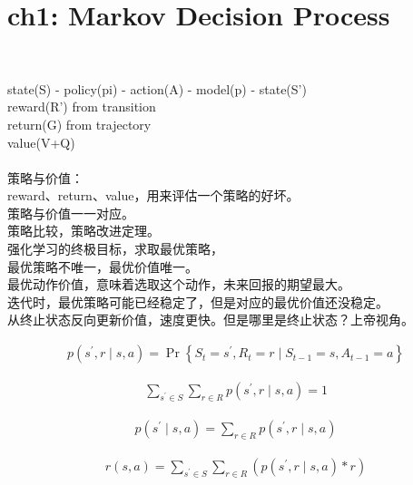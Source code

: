 \documentclass{article}
\begin{document}
\section*{ch1: Markov Decision Process}


~ \\[3pt]  %
\begin{CJK}{UTF8}{gbsn}
    state(S) - policy(pi) - action(A) - model(p) - state(S') \\[3pt]
    reward(R') from transition \\[3pt]
    return(G) from trajectory \\[3pt]
    value(V+Q) \\[3pt]

    ~ \\[3pt]
    策略与价值：\\[3pt]
    reward、return、value，用来评估一个策略的好坏。 \\[3pt]
    策略与价值一一对应。 \\[3pt]
    策略比较，策略改进定理。 \\[3pt]
    强化学习的终极目标，求取最优策略， \\[3pt]
    最优策略不唯一，最优价值唯一。 \\[3pt]
    最优动作价值，意味着选取这个动作，未来回报的期望最大。 \\[3pt]
    迭代时，最优策略可能已经稳定了，但是对应的最优价值还没稳定。 \\[3pt]
    从终止状态反向更新价值，速度更快。但是哪里是终止状态？上帝视角。 \\[3pt]
\end{CJK}


\begin{align*}
    p \left( s^{\prime}, r \mid s, a \right)
    = \operatorname{Pr} \left\{ S_{t}=s^{\prime}, R_{t}=r \mid 
    S_{t-1}=s, A_{t-1}=a \right\}
\end{align*}

\begin{align*}
    \sum_{s^{\prime} \in S} \sum_{r \in R} 
    p \left( s^{\prime}, r \mid s, a \right) = 1
\end{align*}

\begin{align*}
    p \left( s^{\prime} \mid s, a \right)
    = \sum_{r \in R} p \left( s^{\prime}, r \mid s, a \right)
\end{align*}

\begin{align*}
    r(s, a) = \sum_{s^{\prime} \in S} 
    \sum_{r \in R} 
    \left( p \left( s^{\prime}, r \mid s, a \right) * r \right)
\end{align*}
\end{document}
